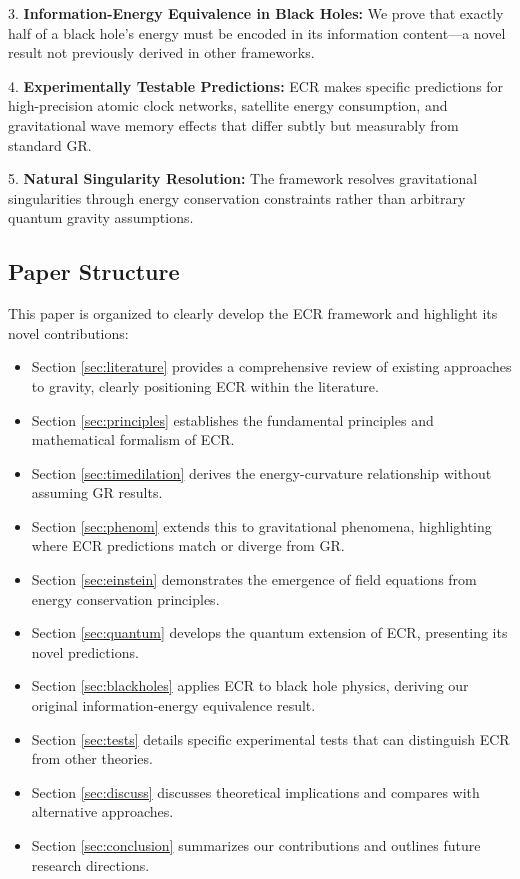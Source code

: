 \documentclass[11pt,a4paper]{article}
\begin{document}
3. \textbf{Information-Energy Equivalence in Black Holes:} We prove that exactly half of a black hole's energy must be encoded in its information content—a novel result not previously derived in other frameworks.

4. \textbf{Experimentally Testable Predictions:} ECR makes specific predictions for high-precision atomic clock networks, satellite energy consumption, and gravitational wave memory effects that differ subtly but measurably from standard GR.

5. \textbf{Natural Singularity Resolution:} The framework resolves gravitational singularities through energy conservation constraints rather than arbitrary quantum gravity assumptions.

\subsection{Paper Structure}

This paper is organized to clearly develop the ECR framework and highlight its novel contributions:

\begin{itemize}
    \item Section \ref{sec:literature} provides a comprehensive review of existing approaches to gravity, clearly positioning ECR within the literature.
    
    \item Section \ref{sec:principles} establishes the fundamental principles and mathematical formalism of ECR.
    
    \item Section \ref{sec:timedilation} derives the energy-curvature relationship without assuming GR results.
    
    \item Section \ref{sec:phenom} extends this to gravitational phenomena, highlighting where ECR predictions match or diverge from GR.
    
    \item Section \ref{sec:einstein} demonstrates the emergence of field equations from energy conservation principles.
    
    \item Section \ref{sec:quantum} develops the quantum extension of ECR, presenting its novel predictions.
    
    \item Section \ref{sec:blackholes} applies ECR to black hole physics, deriving our original information-energy equivalence result.
    
    \item Section \ref{sec:tests} details specific experimental tests that can distinguish ECR from other theories.
    
    \item Section \ref{sec:discuss} discusses theoretical implications and compares with alternative approaches.
    
    \item Section \ref{sec:conclusion} summarizes our contributions and outlines future research directions.
\end{itemize}
\end{document}
